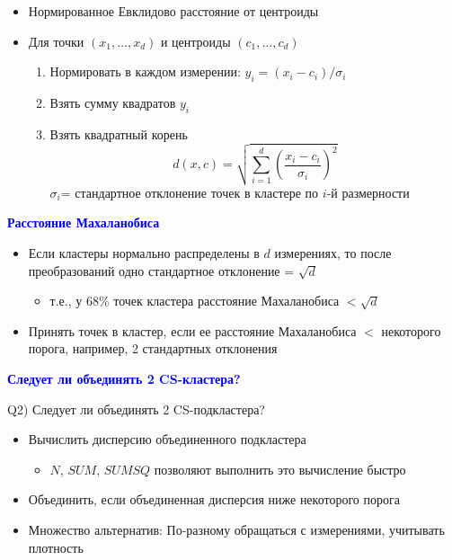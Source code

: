 \documentclass[landscape]{slides}
\begin{document}
\begin{normalsize}
\begin{slide}
\begin{itemize}
\item Нормированное Евклидово расстояние от центроиды
\item Для точки $(x_1,\ldots,x_d)$ и центроиды $(c_1,\ldots,c_d)$
  \begin{enumerate}
  \item Нормировать в каждом измерении: $y_i = (x_i-c_i)/\sigma_i$
  \item Взять сумму квадратов $y_i$
  \item Взять квадратный корень
  $$ d(x,c) = \sqrt{\sum_{i=1}^d \left(\frac{x_i-c_i}{\sigma_i}\right)^2} $$
  $\sigma_i$= стандартное отклонение точек в кластере по $i$-й размерности
  \end{enumerate}
\end{itemize}
\end{slide}



\begin{slide}
\textbf{\textcolor{blue}{Расстояние Махаланобиса}}

\begin{itemize}
\item Если кластеры нормально распределены в $d$ измерениях, то после преобразований одно стандартное отклонение = $\sqrt{d}$
  \begin{itemize}
  \item т.е., у 68\% точек кластера расстояние Махаланобиса $<\sqrt{d}$
  \end{itemize}
\item Принять точек в кластер, если ее расстояние Махаланобиса $<$ некоторого порога,
например, 2 стандартных отклонения
\end{itemize}
\end{slide}



\begin{slide}
\textbf{\textcolor{blue}{Следует ли объединять 2 CS-кластера?}}

Q2) Следует ли объединять 2 CS-подкластера?
\begin{itemize}
\item Вычислить дисперсию объединенного подкластера
  \begin{itemize}
  \item $N$, $SUM$, $SUMSQ$ позволяют выполнить это вычисление быстро
  \end{itemize}
\item Объединить, если объединенная дисперсия ниже некоторого порога
\item Множество альтернатив: По-разному обращаться с измерениями, учитывать плотность
\end{itemize}
\end{slide}



\end{normalsize}
\end{document}
